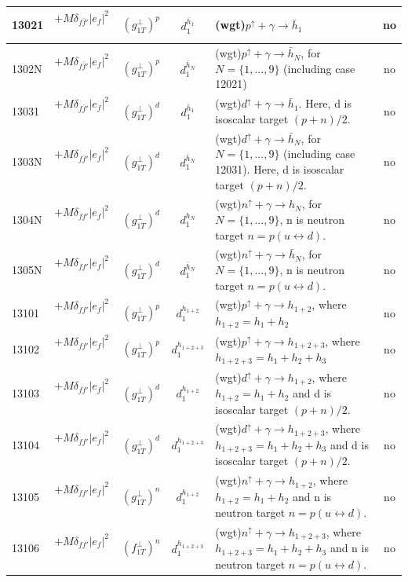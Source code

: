 \documentclass[prd,nofootinbib,eqsecnum,final]{revtex4}
\renewcommand{\(}{\left(}
\renewcommand{\)}{\right)}
\renewcommand{\[}{\left[}
\renewcommand{\]}{\right]}
\begin{document}
\begin{center}
\begin{longtable}{||l|p{6cm}|c|c||p{7cm}|c||}
\\\hline \hline
13021 & $+M\delta_{f\bar f'}|e_f|^2$~~&$(g_{1T}^\perp)^p$ & $d^{\bar h_1}_1$ & (wgt)$p^{\uparrow}+\gamma\to \bar h_1$ & no
\\\hline
1302N & $+M\delta_{f\bar f'}|e_f|^2$~~&$(g_{1T}^\perp)^p$ & $d^{\bar h_N}_1$ & (wgt)$p^{\uparrow}+\gamma\to \bar h_N$, for $N=\{1,...,9\}$ (including case 12021) & no
\\\hline \hline
13031 & $+M\delta_{f\bar f'}|e_f|^2$~~&$(g_{1T}^\perp)^{d}$ & $d^{\bar h_1}_1$ & (wgt)$d^{\uparrow}+\gamma\to \bar h_1$. Here, d is isoscalar target $(p+n)/2$. & no
\\\hline
1303N & $+M\delta_{f\bar f'}|e_f|^2$~~&$(g_{1T}^\perp)^{d}$ & $d^{\bar h_N}_1$ & (wgt)$d^{\uparrow}+\gamma\to \bar h_N$, for $N=\{1,...,9\}$ (including case 12031). Here, d is isoscalar target $(p+n)/2$. & no
\\\hline\hline
1304N & $+M\delta_{ff'}|e_f|^2$~~&$(g_{1T}^\perp)^d$ & $d^{h_N}_1$ & (wgt)$n^{\uparrow}+\gamma\to h_N$, for $N=\{1,...,9\}$, n is neutron target $n=p(u\leftrightarrow d)$. & no
\\\hline
1305N & $+M\delta_{ff'}|e_f|^2$~~&$(g_{1T}^\perp)^d$ & $d^{\bar h_N}_1$ & (wgt)$n^{\uparrow}+\gamma\to \bar h_N$, for $N=\{1,...,9\}$, n is neutron target $n=p(u\leftrightarrow d)$. & no
\\\hline \hline
13101 & $+M\delta_{ff'}|e_f|^2$~~&$(g_{1T}^\perp)^{p}$ & $d^{h_{1+2}}_1$ & (wgt)$p^{\uparrow}+\gamma\to h_{1+2}$, where $h_{1+2}=h_1+h_2$ & no
\\\hline
13102 & $+M\delta_{ff'}|e_f|^2$~~&$(g_{1T}^\perp)^{p}$ & $d^{h_{1+2+3}}_1$ & (wgt)$p^{\uparrow}+\gamma\to h_{1+2+3}$, where $h_{1+2+3}=h_1+h_2+h_3$ & no
\\\hline
13103 & $+M\delta_{ff'}|e_f|^2$~~&$(g_{1T}^\perp)^{d}$ & $d^{h_{1+2}}_1$ & (wgt)$d^{\uparrow}+\gamma\to h_{1+2}$, where $h_{1+2}=h_1+h_2$ and d is isoscalar target $(p+n)/2$. & no
\\\hline
13104 & $+M\delta_{ff'}|e_f|^2$~~&$(g_{1T}^\perp)^{d}$ & $d^{h_{1+2+3}}_1$ & (wgt)$d^{\uparrow}+\gamma\to h_{1+2+3}$, where $h_{1+2+3}=h_1+h_2+h_3$ and d is isoscalar target $(p+n)/2$. & no
\\\hline
13105 & $+M\delta_{ff'}|e_f|^2$~~&$(g_{1T}^\perp)^{n}$ & $d^{h_{1+2}}_1$ & (wgt)$n^{\uparrow}+\gamma\to h_{1+2}$, where $h_{1+2}=h_1+h_2$ and n is neutron target $n=p(u\leftrightarrow d)$. & no
\\\hline
13106 & $+M\delta_{ff'}|e_f|^2$~~&$(f_{1T}^\perp)^{n}$ & $d^{h_{1+2+3}}_1$ & (wgt)$n^{\uparrow}+\gamma\to h_{1+2+3}$, where $h_{1+2+3}=h_1+h_2+h_3$ and n is neutron target $n=p(u\leftrightarrow d)$. & no

\end{longtable}
\end{center}
\end{document}
